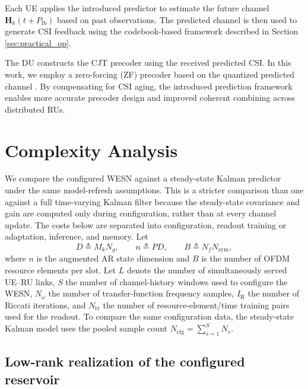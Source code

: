 \documentclass[lettersize,journal]{IEEEtran}
\begin{document}
Each UE applies the introduced predictor to estimate the future channel $\mathbf{H}_k(t + P_{\mathrm{fb}})$ based on past observations. The predicted channel is then used to generate CSI feedback using the codebook-based framework described in Section \ref{sec:practical_op}.

The DU constructs the CJT precoder using the received predicted CSI. In this work, we employ a zero-forcing (ZF) precoder based on the quantized predicted channel \cite{codebook_tut}.
By compensating for CSI aging, the introduced prediction framework enables more accurate precoder design and improved coherent combining across distributed RUs.

\section{Complexity Analysis}

We compare the configured WESN against a steady-state Kalman predictor under
the same model-refresh assumptions.  This is a stricter comparison than one
against a full time-varying Kalman filter because the steady-state covariance
and gain are computed only during configuration, rather than at every channel
update.  The costs below are separated into configuration, readout training or
adaptation, inference, and memory.  Let
\begin{equation}
 D\triangleq M_kN_g,\qquad n\triangleq PD,\qquad
 B\triangleq N_fN_{\mathrm{sym}},
\end{equation}
where $n$ is the augmented AR state dimension and $B$ is the number of OFDM
resource elements per slot.  Let $L$ denote the number of simultaneously
served UE--RU links, $S$ the number of channel-history windows used to
configure the WESN, $N_{\omega}$ the number of transfer-function frequency
samples, $I_{\mathrm{R}}$ the number of Riccati iterations, and $N_{\mathrm{tr}}$
the number of resource-element/time training pairs used for the readout.  To
compare the same configuration data, the steady-state Kalman model uses the
pooled sample count $N_{\mathrm{cfg}}=\sum_{s=1}^{S}N_s$.

\subsection{Low-rank realization of the configured reservoir}
\end{document}
